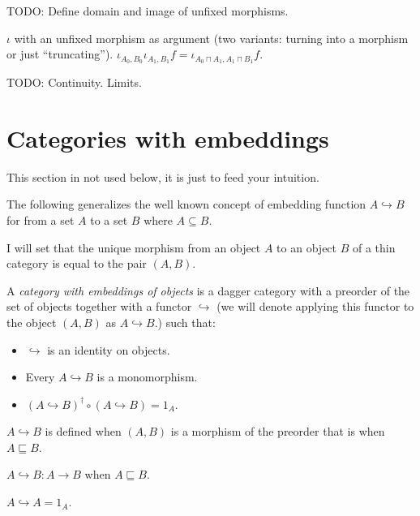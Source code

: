 TODO: Define domain and image of unfixed morphisms.

$\iota$ with an unfixed morphism as argument (two variants:
turning into a morphism or just ``truncating'').
$\iota_{A_0,B_0}\iota_{A_1,B_1}f=
\iota_{A_0\sqcap A_1,A_1\sqcap B_1}f$.

TODO: Continuity. Limits.

\section{Categories with embeddings}

\begin{note}
This section in not used below, it is just to feed your intuition.
\end{note}

The following generalizes the well known concept of embedding function $A
\hookrightarrow B$ for from a set $A$ to a set $B$ where $A \subseteq B$.

I will set that the unique morphism from an object $A$ to an object $B$ of a
thin category is equal to the pair $(A , B)$.

\begin{defn}
  A \emph{category with embeddings of objects} is a dagger category with a
  preorder of the set of objects together with a functor $\hookrightarrow$ (we
  will denote applying this functor to the object $(A , B)$ as $A
  \hookrightarrow B$.) such that:
  \begin{itemize}
    \item $\hookrightarrow$ is an identity on objects.
    
    \item Every $A \hookrightarrow B$ is a monomorphism.
    
    \item $(A \hookrightarrow B)^{\dagger} \circ (A \hookrightarrow B) = 1_A$.
  \end{itemize}
\end{defn}

\begin{obvious}
$A\hookrightarrow B$ is defined when $(A , B)$ is a morphism of the preorder
that is when $A \sqsubseteq B$.
\end{obvious}

\begin{obvious}
$A \hookrightarrow B : A \rightarrow B$ when $A \sqsubseteq B$.
\end{obvious}

\begin{prop}
  $A \hookrightarrow A = 1_A$.
\end{prop}

